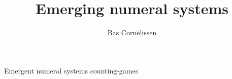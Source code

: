 \documentclass{../src/bcthesispart}
\title{Emerging numeral systems}
\author{Bas Cornelissen}
\begin{document}
%
	{Emergent numeral systems}
	{counting-games}{%
	}
%
%
%
\end{document}
